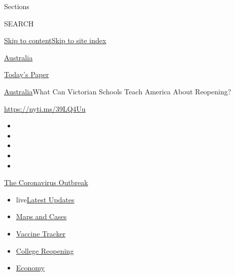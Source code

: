 Sections

SEARCH

\protect\hyperlink{site-content}{Skip to
content}\protect\hyperlink{site-index}{Skip to site index}

\href{https://www.nytimes3xbfgragh.onion/section/world/australia}{Australia}

\href{https://myaccount.nytimes3xbfgragh.onion/auth/login?response_type=cookie\&client_id=vi}{}

\href{https://www.nytimes3xbfgragh.onion/section/todayspaper}{Today's
Paper}

\href{/section/world/australia}{Australia}\textbar{}What Can Victorian
Schools Teach America About Reopening?

\url{https://nyti.ms/39LQ4Uu}

\begin{itemize}
\item
\item
\item
\item
\item
\end{itemize}

\href{https://www.nytimes3xbfgragh.onion/news-event/coronavirus?action=click\&pgtype=Article\&state=default\&region=TOP_BANNER\&context=storylines_menu}{The
Coronavirus Outbreak}

\begin{itemize}
\tightlist
\item
  live\href{https://www.nytimes3xbfgragh.onion/2020/08/04/world/coronavirus-cases.html?action=click\&pgtype=Article\&state=default\&region=TOP_BANNER\&context=storylines_menu}{Latest
  Updates}
\item
  \href{https://www.nytimes3xbfgragh.onion/interactive/2020/us/coronavirus-us-cases.html?action=click\&pgtype=Article\&state=default\&region=TOP_BANNER\&context=storylines_menu}{Maps
  and Cases}
\item
  \href{https://www.nytimes3xbfgragh.onion/interactive/2020/science/coronavirus-vaccine-tracker.html?action=click\&pgtype=Article\&state=default\&region=TOP_BANNER\&context=storylines_menu}{Vaccine
  Tracker}
\item
  \href{https://www.nytimes3xbfgragh.onion/2020/08/02/us/covid-college-reopening.html?action=click\&pgtype=Article\&state=default\&region=TOP_BANNER\&context=storylines_menu}{College
  Reopening}
\item
  \href{https://www.nytimes3xbfgragh.onion/live/2020/08/04/business/stock-market-today-coronavirus?action=click\&pgtype=Article\&state=default\&region=TOP_BANNER\&context=storylines_menu}{Economy}
\end{itemize}

